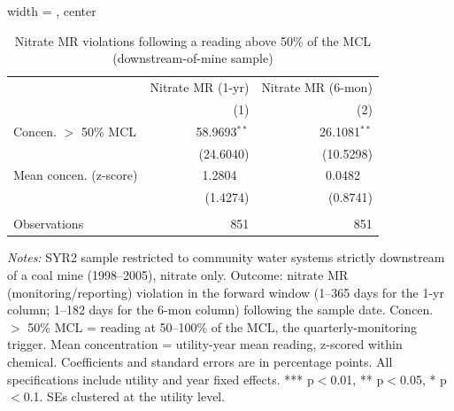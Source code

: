 
\begin{table}[htbp]
\caption{Nitrate MR violations following a reading above 50\% of the MCL (downstream-of-mine sample)}\label{tab:mr_concentration_lag_ols}
\centering
\begin{adjustbox}{width = \textwidth, center}
   \begin{tabular}{lrr}
      \toprule    
                      & Nitrate MR (1-yr) & Nitrate MR (6-mon) \\   
                      & (1)               & (2)\\  
      \midrule 
      Concen. $>$ 50\% MCL       & 58.9693$^{**}$    & 26.1081$^{**}$\\   
                      & (24.6040)         & (10.5298)\\   
      Mean concen. (z-score)   & 1.2804$^{\phantom{**}}$            & 0.0482$^{\phantom{**}}$\\   
                      & (1.4274)          & (0.8741)\\   
       \\
      Observations    & 851               & 851\\  
      \bottomrule
   \end{tabular}
\end{adjustbox}
{\tiny\linespread{1}\selectfont \par \raggedright \textit{Notes:} SYR2 sample restricted to community water systems strictly downstream of a coal mine (1998--2005), nitrate only. Outcome: nitrate MR (monitoring/reporting) violation in the forward window (1--365 days for the 1-yr column; 1--182 days for the 6-mon column) following the sample date. Concen. $>$ 50\% MCL = reading at 50--100\% of the MCL, the quarterly-monitoring trigger. Mean concentration = utility-year mean reading, z-scored within chemical. Coefficients and standard errors are in percentage points. All specifications include utility and year fixed effects. *** p$<$0.01, ** p$<$0.05, * p$<$0.1. SEs clustered at the utility level.}
\end{table}
